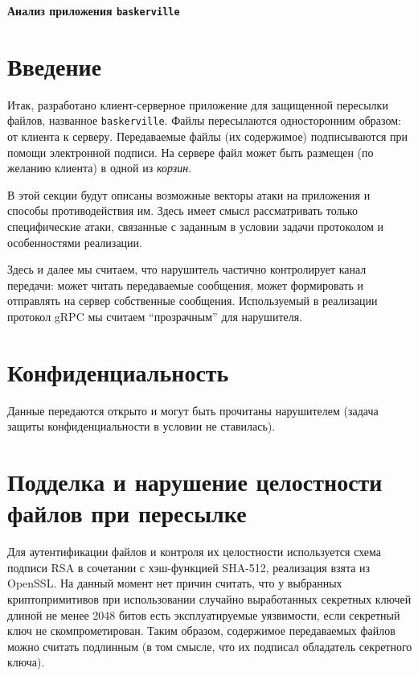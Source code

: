 \documentclass[a4paper,12pt]{article}
\begin{document}
\large
\sffamily
\thispagestyle{fancy}

\begin{center}\LARGE\renewcommand{\baselinestretch}{.9}
\textbf{Анализ приложения {\tt baskerville}}\\
\end{center}

\section*{Введение}

Итак, разработано клиент-серверное приложение для защищенной пересылки файлов, названное {\tt baskerville}.
Файлы пересылаются односторонним образом: от клиента к серверу. Передаваемые файлы (их содержимое)
подписываются при помощи электронной подписи.
На сервере файл может быть размещен (по желанию клиента) в одной из \emph{корзин}.

В этой секции будут описаны возможные векторы атаки на приложения и способы противодействия им. 
Здесь имеет смысл рассматривать только  специфические атаки, связанные с заданным в условии  задачи протоколом и особенностями реализации.

Здесь и далее мы считаем, что нарушитель частично контролирует канал передачи: может читать передаваемые сообщения, может формировать
и отправлять на сервер собственные сообщения. Используемый в реализации протокол gRPC мы считаем ``прозрачным'' для нарушителя.

\section{Конфиденциальность}

Данные передаются открыто и могут быть прочитаны нарушителем (задача защиты конфиденциальности в условии не ставилась).

\section{Подделка и нарушение целостности файлов при пересылке}

Для аутентификации файлов и контроля их целостности используется схема подписи RSA в сочетании с хэш-функцией SHA-512, реализация взята 
из OpenSSL. На данный момент нет причин считать, что у выбранных криптопримитивов при использовании случайно выработанных секретных ключей длиной не менее 2048 битов
есть эксплуатируемые уязвимости, если секретный ключ не скомпрометирован. Таким образом, содержимое передаваемых файлов можно  считать  подлинным (в том смысле, что их подписал обладатель секретного ключа).
\end{document}
